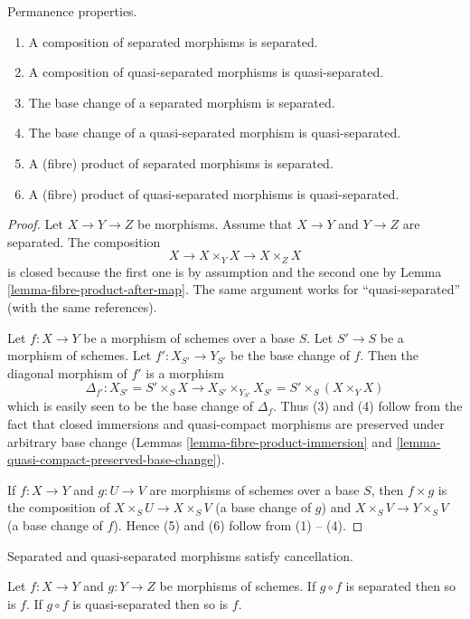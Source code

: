\begin{lemma}
\label{lemma-separated-permanence}
\begin{reference}
\cite[Chapter II, \S 1, no. 35, p. 228]{FAC}
\end{reference}
Permanence properties.
\begin{enumerate}
\item A composition of separated morphisms is separated.
\item A composition of quasi-separated morphisms is quasi-separated.
\item The base change of a separated morphism is separated.
\item The base change of a quasi-separated morphism is quasi-separated.
\item A (fibre) product of separated morphisms is separated.
\item A (fibre) product of quasi-separated morphisms is quasi-separated.
\end{enumerate}
\end{lemma}

\begin{proof}
Let $X \to Y \to Z$ be morphisms. Assume that $X \to Y$ and
$Y \to Z$ are separated. The composition
$$
X \to X \times_Y X \to X \times_Z X
$$
is closed because the first one is by assumption and the second
one by Lemma \ref{lemma-fibre-product-after-map}. The same argument
works for ``quasi-separated'' (with the same references).

\medskip\noindent
Let $f : X \to Y$ be a morphism of schemes over a base $S$.
Let $S' \to S$ be a morphism of schemes. Let $f' : X_{S'} \to Y_{S'}$
be the base change of $f$. Then the diagonal morphism
of $f'$ is a morphism
$$
\Delta_{f'} :
X_{S'} = S' \times_S X
\longrightarrow
X_{S'} \times_{Y_{S'}} X_{S'} = S' \times _S (X \times_Y X)
$$
which is easily seen to be the base change of $\Delta_f$.
Thus (3) and (4) follow from the fact that
closed immersions and quasi-compact morphisms are preserved
under arbitrary base change (Lemmas
\ref{lemma-fibre-product-immersion} and
\ref{lemma-quasi-compact-preserved-base-change}).

\medskip\noindent
If $f : X \to Y$ and $g : U \to V$ are morphisms of schemes over a base $S$,
then $f \times g$ is the composition of $X \times_S U \to X \times_S V$
(a base change of $g$) and $X \times_S V \to Y \times_S V$ (a base change
of $f$). Hence (5) and (6) follow from (1) -- (4).
\end{proof}

\begin{lemma}
\label{lemma-compose-after-separated}
\begin{slogan}
Separated and quasi-separated morphisms satisfy cancellation.
\end{slogan}
Let $f : X \to Y$ and $g : Y \to Z$ be morphisms of schemes.
If $g \circ f$ is separated then so is $f$.
If $g \circ f$ is quasi-separated then so is $f$.
\end{lemma}

